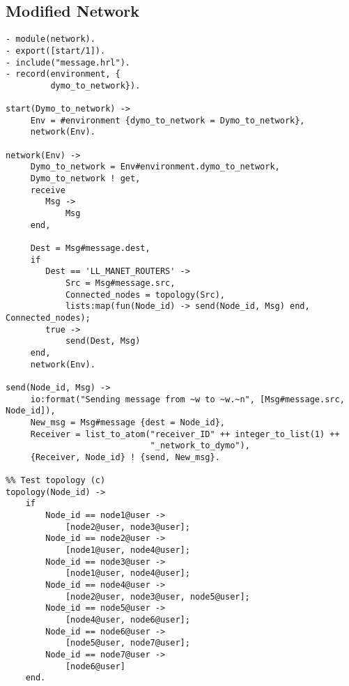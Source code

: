 \subsection*{Modified Network}
\footnotesize
\begin{verbatim}
- module(network).
- export([start/1]).
- include("message.hrl").
- record(environment, {
         dymo_to_network}).

start(Dymo_to_network) -> 
     Env = #environment {dymo_to_network = Dymo_to_network},
     network(Env).

network(Env) -> 
     Dymo_to_network = Env#environment.dymo_to_network,
     Dymo_to_network ! get,
     receive 
        Msg -> 
            Msg
     end,
    
     Dest = Msg#message.dest,
     if
        Dest == 'LL_MANET_ROUTERS' ->
            Src = Msg#message.src,
            Connected_nodes = topology(Src),
            lists:map(fun(Node_id) -> send(Node_id, Msg) end, Connected_nodes);
        true ->
            send(Dest, Msg)
     end,
     network(Env).

send(Node_id, Msg) ->
     io:format("Sending message from ~w to ~w.~n", [Msg#message.src, Node_id]),
     New_msg = Msg#message {dest = Node_id},
     Receiver = list_to_atom("receiver_ID" ++ integer_to_list(1) ++ 
                             "_network_to_dymo"),
     {Receiver, Node_id} ! {send, New_msg}.

%% Test topology (c)
topology(Node_id) ->
    if
        Node_id == node1@user ->
            [node2@user, node3@user];
        Node_id == node2@user ->
            [node1@user, node4@user];
        Node_id == node3@user ->
            [node1@user, node4@user];
        Node_id == node4@user ->
            [node2@user, node3@user, node5@user];
        Node_id == node5@user ->
            [node4@user, node6@user];
        Node_id == node6@user ->
            [node5@user, node7@user];
        Node_id == node7@user ->
            [node6@user]
    end.
\end{verbatim}
\normalsize